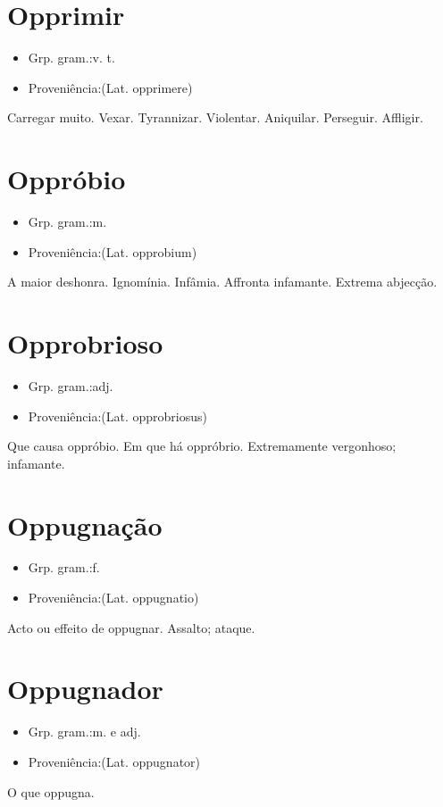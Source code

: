 \section{Opprimir}
\begin{itemize}
\item {Grp. gram.:v. t.}
\end{itemize}
\begin{itemize}
\item {Proveniência:(Lat. \textunderscore opprimere\textunderscore )}
\end{itemize}
Carregar muito.
Vexar.
Tyrannizar.
Violentar.
Aniquilar.
Perseguir.
Affligir.
\section{Oppróbio}
\begin{itemize}
\item {Grp. gram.:m.}
\end{itemize}
\begin{itemize}
\item {Proveniência:(Lat. \textunderscore opprobium\textunderscore )}
\end{itemize}
A maior deshonra.
Ignomínia.
Infâmia.
Affronta infamante.
Extrema abjecção.
\section{Opprobrioso}
\begin{itemize}
\item {Grp. gram.:adj.}
\end{itemize}
\begin{itemize}
\item {Proveniência:(Lat. \textunderscore opprobriosus\textunderscore )}
\end{itemize}
Que causa oppróbio.
Em que há oppróbrio.
Extremamente vergonhoso; infamante.
\section{Oppugnação}
\begin{itemize}
\item {Grp. gram.:f.}
\end{itemize}
\begin{itemize}
\item {Proveniência:(Lat. \textunderscore oppugnatio\textunderscore )}
\end{itemize}
Acto ou effeito de oppugnar.
Assalto; ataque.
\section{Oppugnador}
\begin{itemize}
\item {Grp. gram.:m.  e  adj.}
\end{itemize}
\begin{itemize}
\item {Proveniência:(Lat. \textunderscore oppugnator\textunderscore )}
\end{itemize}
O que oppugna.
